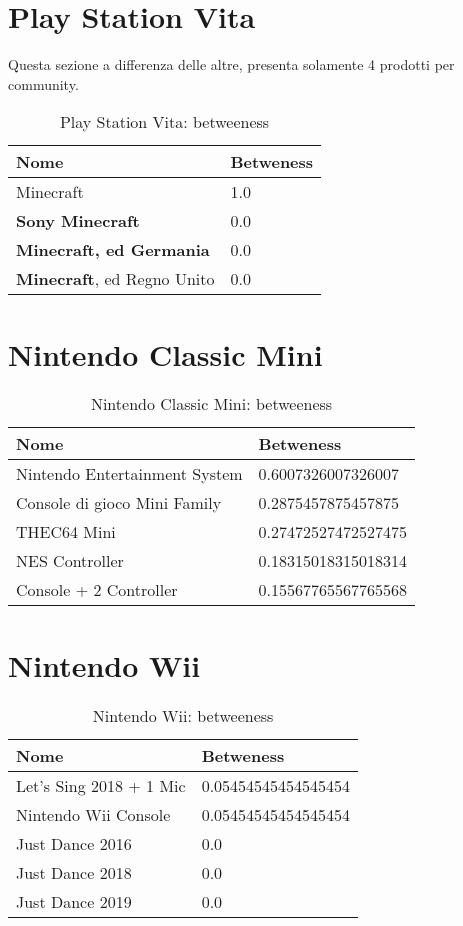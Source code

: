 \pagebreak

	\section{Play Station Vita}
		Questa sezione a differenza delle altre, presenta solamente 4 prodotti per community.
		\begin{table}[H]
			\caption{Play Station Vita: betweeness}
			\label{tab:psvita}
			\centering
			\begin{tabular}{ll}
				\toprule 
				\textbf{Nome} & \textbf{Betweness} \\
				\midrule
				Minecraft & 1.0 \\
				\textbf{Sony Minecraft} & 0.0 \\
				\textbf{Minecraft, ed Germania} & 0.0 \\
				\textbf{Minecraft}, ed Regno Unito & 0.0 \\
				\bottomrule
			\end{tabular}
		\end{table}
	
	\section{Nintendo Classic Mini}
		\begin{table}[H]
			\caption{Nintendo Classic Mini: betweeness}
			\label{tab:nintendoclassicmini}
			\centering
			\begin{tabular}{ll}
				\toprule 
				\textbf{Nome} & \textbf{Betweness} \\
				\midrule
				Nintendo Entertainment System & 0.6007326007326007 \\
				Console di gioco Mini Family & 0.2875457875457875 \\
				THEC64 Mini & 0.27472527472527475 \\
				NES Controller & 0.18315018315018314 \\
			    Console + 2 Controller & 0.15567765567765568 \\		
				\bottomrule
			\end{tabular}
		\end{table}
			
		\section{Nintendo Wii}
			\begin{table}[H]
				\caption{Nintendo Wii: betweeness}
				\label{tab:wii}
				\centering
				\begin{tabular}{ll}
					\toprule 
					\textbf{Nome} & \textbf{Betweness} \\
					\midrule
					Let's Sing 2018 + 1 Mic & 0.05454545454545454 \\
					Nintendo Wii Console & 0.05454545454545454 \\
					Just Dance 2016 & 0.0 \\
					Just Dance 2018 & 0.0 \\
					Just Dance 2019 & 0.0 \\		
					\bottomrule
				\end{tabular}
			\end{table}
		
